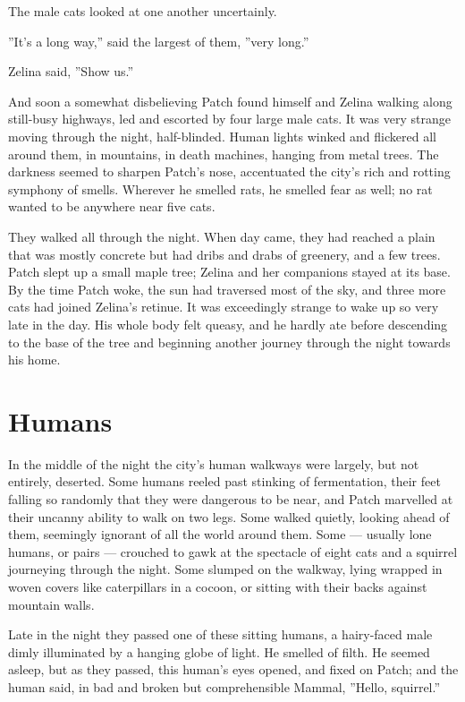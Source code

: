 \documentclass[12pt]{book}
\begin{document}
The male cats looked at one another uncertainly.

''It's a long way,'' said the largest of them, ''very long.''

Zelina said, ''Show us.''

And soon a somewhat disbelieving Patch found himself and Zelina
walking along still-busy highways, led and escorted by four large male
cats. It was very strange moving through the night,
half-blinded. Human lights winked and flickered all around them, in
mountains, in death machines, hanging from metal trees. The darkness
seemed to sharpen Patch's nose, accentuated the city's rich and
rotting symphony of smells. Wherever he smelled rats, he smelled fear
as well; no rat wanted to be anywhere near five cats.

They walked all through the night. When day came, they had reached a
plain that was mostly concrete but had dribs and drabs of greenery,
and a few trees. Patch slept up a small maple tree; Zelina and her
companions stayed at its base. By the time Patch woke, the sun had
traversed most of the sky, and three more cats had joined Zelina's
retinue. It was exceedingly strange to wake up so very late in the
day. His whole body felt queasy, and he hardly ate before descending
to the base of the tree and beginning another journey through the
night towards his home.


\section{Humans}

In the middle of the night the city's human walkways were largely, but
not entirely, deserted. Some humans reeled past stinking of
fermentation, their feet falling so randomly that they were dangerous
to be near, and Patch marvelled at their uncanny ability to walk on
two legs. Some walked quietly, looking ahead of them, seemingly
ignorant of all the world around them. Some --- usually lone humans,
or pairs --- crouched to gawk at the spectacle of eight cats and a
squirrel journeying through the night. Some slumped on the walkway,
lying wrapped in woven covers like caterpillars in a cocoon, or
sitting with their backs against mountain walls.

Late in the night they passed one of these sitting humans, a
hairy-faced male dimly illuminated by a hanging globe of light. He
smelled of filth. He seemed asleep, but as they passed, this human's
eyes opened, and fixed on Patch; and the human said, in bad and broken
but comprehensible Mammal, ''Hello, squirrel.''
\end{document}

